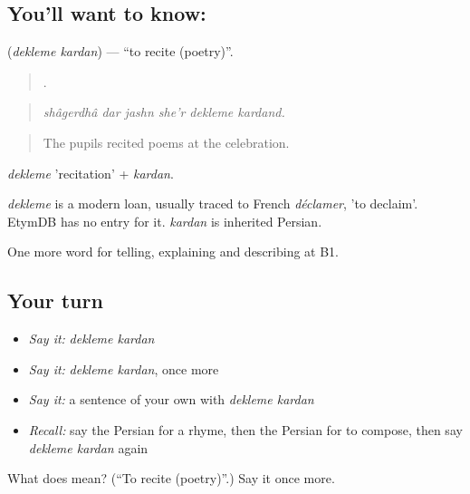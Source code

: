 \subsection*{You'll want to know:  }
\textbf{ } (\emph{dekleme kardan}) — \textquotedblleft{}to recite (poetry)\textquotedblright{}.

\begin{quote}
     .
\end{quote}

\begin{quote}
\emph{shâgerdhâ dar jashn she'r dekleme kardand.}
\end{quote}

\begin{quote}
The pupils recited poems at the celebration.
\end{quote}

\emph{dekleme} 'recitation' + \emph{kardan}.

\begin{cousinweb}
\emph{dekleme} is a modern loan, usually traced to French \emph{déclamer}, 'to declaim'. EtymDB has no entry for it. \emph{kardan} is inherited Persian.
\end{cousinweb}

\begin{grammarlens}[title={What you've built}]
One more word for telling, explaining and describing at B1.
\end{grammarlens}

\subsection*{Your turn}
\begin{itemize}
\raggedright
  \item \emph{Say it:} \emph{dekleme kardan}
  \item \emph{Say it:} \emph{dekleme kardan}, once more
  \item \emph{Say it:} a sentence of your own with \emph{dekleme kardan}
  \item \emph{Recall:} say the Persian for a rhyme, then the Persian for to compose, then say \emph{dekleme kardan} again
\end{itemize}

\begin{tcolorbox}[breakable,colback=teal!4,colframe=teal!35!black,title={Before you move on}]
What does   mean? (\textquotedblleft{}To recite (poetry)\textquotedblright{}.) Say it once more.
\end{tcolorbox}
